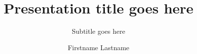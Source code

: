 \documentclass[12pt, aspectratio=149]{beamer}%
\title    {Presentation title goes here}%
\subtitle {Subtitle goes here}%
\author   {Firstname Lastname}%
\institute{Mechanics of Materials}%
\begin{document}
\begin{TitleSlide}\end{TitleSlide}%

	\begin{TableOfContents}
	\vspace{2mm}
	\hfill\parbox{.72\textwidth}{
	\begin{minipage}[t][4cm][t]{\textwidth}
	\tableofcontents
	\end{minipage}}
	\end{TableOfContents}

	
	
	
	
	


\begin{References}\end{References}%

\begin{ThankYouPage}\end{ThankYouPage}%


\end{document}
